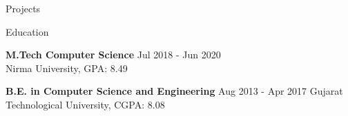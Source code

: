 \documentclass{resume} %
\begin{document}
\begin{rSection}{Projects}




\end{rSection}




\begin{rSection}{Education}

{\bf M.Tech Computer Science} \hfill {Jul 2018 - Jun 2020 }
\\ 
Nirma University, GPA: 8.49

{\bf B.E. in Computer Science and Engineering} \hfill {Aug 2013 - Apr 2017 }
Gujarat Technological University, CGPA: 8.08


\end{rSection}
\end{document}
